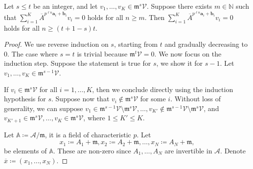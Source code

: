 \documentclass[10pt,a4paper]{amsart}
\newcommand{\A}{\mathbb{A}}
\newcommand{\N}{\mathbb{N}}
\newcommand{\ba}{\boldsymbol{a}}
\newcommand{\bb}{\boldsymbol{b}}
\newcommand{\frm}{\mathfrak{m}}
\newcommand{\mA}{\mathcal{A}}
\newcommand{\mV}{\mathcal{V}}
\newcommand{\oA}{\overline{A}}
\newcommand{\ox}{\overline{x}}
\begin{document}
\begin{lem}\label{lem:syminduction}
    Let $s \leq t$ be an integer, and let $v_1, \ldots, v_K \in \frm^{s}\mV$. 
    Suppose there exists $m \in \N$ such that $\sum_{i = 1}^K \oA^{p^{\ell n} \ba_i + \bb_i} v_i = 0$ holds for all $n \geq m$. Then $\sum_{i = 1}^K \oA^{p^{\ell n} \ba_i + \bb_i} v_i = 0$ holds for all $n \geq (t+1-s)t$.
\end{lem}

\begin{proof}
    We use reverse induction on $s$, starting from $t$ and gradually decreasing to $0$.
    The case where $s = t$ is trivial because $\frm^{t}\mV = 0$. We now focus on the induction step.
    Suppose the statement is true for $s$, we show it for $s-1$.
    Let $v_1, \ldots, v_K \in \frm^{s-1}\mV$.
    
    If $v_i \in \frm^{s} \mV$ for all $i = 1, \ldots, K$, then we conclude directly using the induction hypothesis for $s$.
    Suppose now that $v_i \notin \frm^{s} \mV$ for some $i$. 
    Without loss of generality, we can suppose $v_1 \in \frm^{s-1} \mV \setminus \frm^{s} \mV, \ldots, v_{K'} \notin \frm^{s-1} \mV \setminus \frm^{s} \mV$, and $v_{K'+1} \in \frm^{s} \mV, \ldots, v_K \in \frm^{s} \mV$, where $1 \leq K' \leq K$.
    
    Let $\A \coloneqq \mA/\frm$, it is a field of characteristic $p$.
    Let
    \[
    x_1 \coloneqq A_1 + \frm, x_2 \coloneqq A_2 + \frm, \ldots, x_N \coloneqq A_N + \frm,
    \]
    be elements of $\A$. These are non-zero since $A_1, \ldots, A_N$ are invertible in $\mA$. Denote $\ox \coloneqq (x_1, \ldots, x_N)$.
    

\end{proof}
\end{document}
